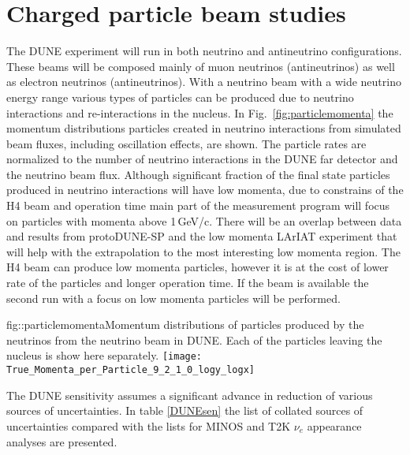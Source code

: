 \section{Charged particle beam studies}

The DUNE experiment will run in both neutrino and antineutrino 
configurations. These beams will be composed mainly of muon neutrinos (antineutrinos) as well as electron neutrinos (antineutrinos). With a neutrino beam with a wide neutrino energy range various types of particles can be produced due to neutrino interactions and re-interactions in the nucleus.  In Fig.~\ref{fig:particlemomenta} the momentum distributions particles created in 
neutrino interactions from simulated beam fluxes, including oscillation effects, are shown.  The particle rates are normalized  to the number of neutrino interactions in 
the DUNE far detector and the neutrino beam flux.  Although significant fraction of the final state particles produced in neutrino interactions  will have low momenta, due to constrains of the H4 beam and operation time main part of the measurement program will focus on particles with momenta above 1\,GeV/c. There will be an overlap between data and results from protoDUNE-SP and the low momenta LArIAT experiment that will help with the extrapolation to the most interesting low momenta region.  The H4 beam can produce low momenta particles, however it is at the cost of lower rate of the particles and longer operation time. If the beam is available the second run with a focus on  low momenta particles will be performed. 


\begin{cdrfigure} {fig::particlemomenta}{Momentum distributions of particles produced by the neutrinos from the neutrino beam in DUNE.  Each of the particles leaving the nucleus is show here separately. } 
  \texttt{[image: True\_Momenta\_per\_Particle\_9\_2\_1\_0\_logy\_logx]}
\end{cdrfigure}

The DUNE sensitivity assumes a significant advance in reduction of various sources of uncertainties. In table \ref{DUNEsen} the list of collated sources of uncertainties compared with the lists for MINOS and T2K $\nu_e$ appearance analyses are presented. 

